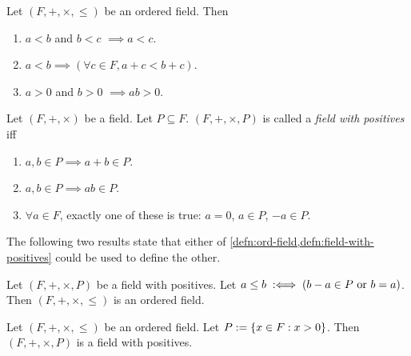 \documentclass[a4paper, 12pt, fleqn]{article}
\begin{document}
\begin{lemma}
Let $(F, +, \times, \le)$ be an ordered field. Then
\begin{enumerate}
\item $a < b$ and $b < c$ $\implies a < c$.
\item $a < b \implies (\forall c \in F, a + c < b + c)$.
\item $a > 0$ and $b > 0$ $\implies ab > 0$.
\end{enumerate}
\end{lemma}
\begin{comment}
\leavevmode
\begin{enumerate}
\item $a = c \implies (a < b \textrm{ and } b < a) \implies \bot$.
\item $a + c = b + c \implies a = b \implies \bot$.
\item $ab = 0 \implies (a = 0 \textrm{ or } b = 0) \implies \bot$ by
    \cref{thm:field-basics}.\ref{item:field-basics:zero-prod}.
\end{enumerate}
\end{comment}

\begin{definition}
\label{defn:field-with-positives}
Let $(F, +, \times)$ be a field. Let $P \subseteq F$.
$(F, +, \times, P)$ is called a \emph{field with positives} iff
\begin{enumerate}
\item $a, b \in P \implies a + b \in P$.
\item $a, b \in P \implies ab \in P$.
\item $\forall a \in F$, exactly one of these is true:
    $a = 0$, $a \in P$, $-a \in P$.
\end{enumerate}
\end{definition}

The following two results state that either of \cref{defn:ord-field,defn:field-with-positives}
could be used to define the other.

\begin{lemma}
Let $(F, +, \times, P)$ be a field with positives.
Let $a \le b \;:\Longleftrightarrow\; (b - a \in P \textrm{ or } b = a)$.
Then $(F, +, \times, \le)$ is an ordered field.
\end{lemma}

\begin{lemma}
Let $(F, +, \times, \le)$ be an ordered field. Let $P := \{x \in F: x > 0\}$.
Then $(F, +, \times, P)$ is a field with positives.
\end{lemma}
\end{document}
